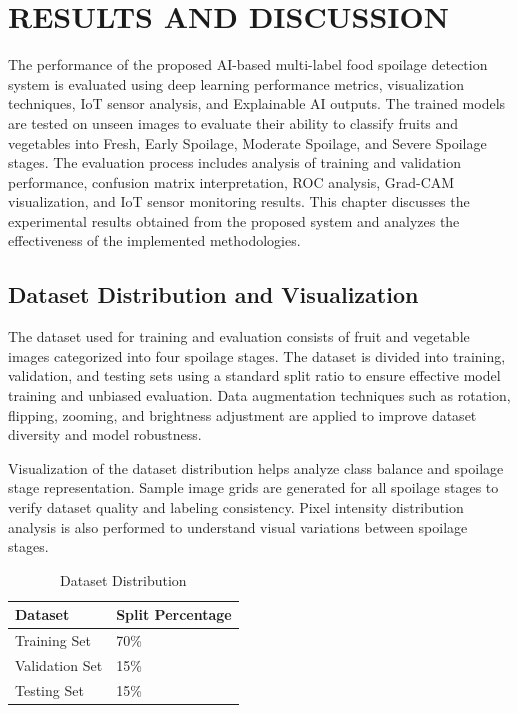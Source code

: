 \chapter{RESULTS AND DISCUSSION}
The performance of the proposed AI-based multi-label food spoilage detection system is evaluated using deep learning performance metrics, visualization techniques, IoT sensor analysis, and Explainable AI outputs. The trained models are tested on unseen images to evaluate their ability to classify fruits and vegetables into Fresh, Early Spoilage, Moderate Spoilage, and Severe Spoilage stages. The evaluation process includes analysis of training and validation performance, confusion matrix interpretation, ROC analysis, Grad-CAM visualization, and IoT sensor monitoring results. This chapter discusses the experimental results obtained from the proposed system and analyzes the effectiveness of the implemented methodologies.

\section[Dataset Distribution and Visualization]{\textbf{Dataset Distribution and Visualization}}
The dataset used for training and evaluation consists of fruit and vegetable images categorized into four spoilage stages. The dataset is divided into training, validation, and testing sets using a standard split ratio to ensure effective model training and unbiased evaluation. Data augmentation techniques such as rotation, flipping, zooming, and brightness adjustment are applied to improve dataset diversity and model robustness.

Visualization of the dataset distribution helps analyze class balance and spoilage stage representation. Sample image grids are generated for all spoilage stages to verify dataset quality and labeling consistency. Pixel intensity distribution analysis is also performed to understand visual variations between spoilage stages.

\begin{table}[H]
	\centering
	\caption{Dataset Distribution}
	\label{tab:dataset_distribution}
	\begin{tabular}{|l|l|}
		\hline
		\textbf{Dataset} & \textbf{Split Percentage} \\ \hline
		Training Set & 70\% \\ \hline
		Validation Set & 15\% \\ \hline
		Testing Set & 15\% \\ \hline
	\end{tabular}
\end{table}

